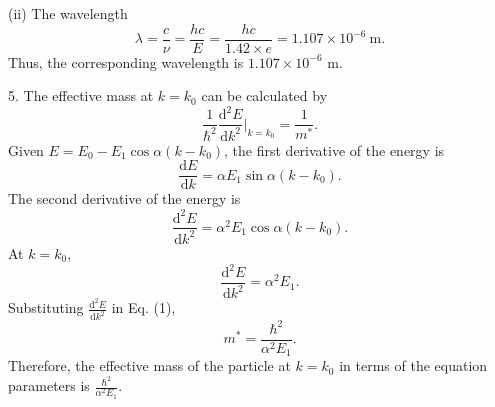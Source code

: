 \documentclass[a4paper,x11names]{article}
\begin{document}
(ii) The wavelength
$$\lambda=\frac{c}{\nu}=\frac{hc}{E}=\frac{hc}{1.42\times e}=1.107\times10^{-6}\ \text{m}.$$
Thus, the corresponding wavelength is $1.107\times10^{-6}$ m.

5. The effective mass at $k=k_0$ can be calculated by
\begin{equation}
    \frac{1}{\hbar^2}\frac{\mathrm{d}^2E}{\mathrm{d}k^2}\bigg|_{k=k_0}=\frac{1}{m^*}.
\end{equation}
Given $E=E_0-E_1\cos{\alpha(k-k_0)}$, the first derivative of the energy is
$$\frac{\mathrm{d}E}{\mathrm{d}k}=\alpha E_1\sin{\alpha(k-k_0)}.$$
The second derivative of the energy is
$$\frac{\mathrm{d}^2E}{\mathrm{d}k^2}=\alpha^2E_1\cos{\alpha(k-k_0)}.$$
At $k=k_0$,
$$\frac{\mathrm{d}^2E}{\mathrm{d}k^2}=\alpha^2E_1.$$
Substituting $\frac{\mathrm{d}^2E}{\mathrm{d}k^2}$ in Eq. (1),
$$m^*=\frac{\hbar^2}{\alpha^2E_1}.$$
Therefore, the effective mass of the particle at $k=k_0$ in terms of the equation parameters is $\frac{\hbar^2}{\alpha^2E_1}$.
\end{document}

